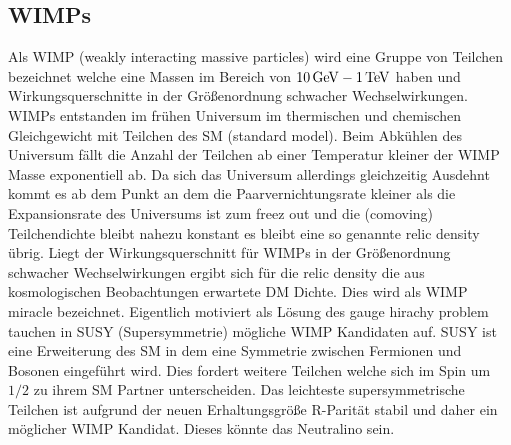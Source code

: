 \subsection*{WIMPs}
Als WIMP (weakly interacting massive particles) wird eine Gruppe von Teilchen bezeichnet welche eine Massen im Bereich von $\SI{10}{\giga\electronvolt}\--\SI{1}{\tera\electronvolt}$ haben und Wirkungsquerschnitte in der Größenordnung schwacher Wechselwirkungen\cite{Drees2012}.
WIMPs entstanden im frühen Universum im thermischen und chemischen Gleichgewicht mit Teilchen des SM (standard model). 
Beim Abkühlen des Universum fällt die Anzahl der Teilchen ab einer Temperatur kleiner der WIMP Masse exponentiell ab.
Da sich das Universum allerdings gleichzeitig Ausdehnt kommt es ab dem Punkt an dem die Paarvernichtungsrate kleiner als die Expansionsrate des Universums ist zum freez out und die (comoving) Teilchendichte bleibt nahezu konstant es bleibt eine so genannte relic density übrig.
Liegt der Wirkungsquerschnitt für WIMPs in der Größenordnung schwacher Wechselwirkungen ergibt sich für die relic density die aus kosmologischen Beobachtungen erwartete DM Dichte.
Dies wird als WIMP miracle bezeichnet.
Eigentlich motiviert als Lösung des gauge hirachy problem tauchen in SUSY (Supersymmetrie) mögliche WIMP Kandidaten auf.
SUSY ist eine Erweiterung des SM in dem eine Symmetrie zwischen Fermionen und Bosonen eingeführt wird.
Dies fordert weitere Teilchen welche sich im Spin um $1/2$ zu ihrem SM Partner unterscheiden.
Das leichteste supersymmetrische Teilchen ist aufgrund der neuen Erhaltungsgröße R-Parität stabil und daher ein möglicher WIMP Kandidat.
Dieses könnte das Neutralino sein.\cite{Feng2010}


